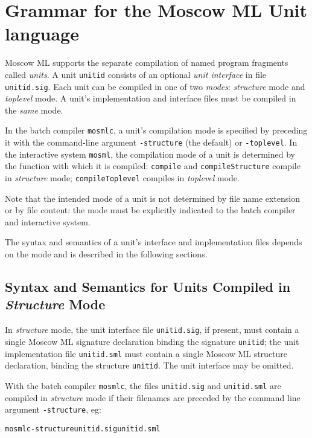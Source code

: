 \documentclass[fleqn]{article}
\begin{document}
\newpage

\section{Grammar for the Moscow ML Unit language}


Moscow ML supports the separate compilation of named program fragments
called \emph{units}.  A unit {\tt unitid} consists of an optional
\emph{unit interface} in file {\tt unitid.sig}.  Each unit can be
compiled in one of two \emph{modes}: \emph{structure} mode and
\emph{toplevel} mode.  A unit's implementation and interface files
must be compiled in the \emph{same} mode.

In the batch compiler {\tt mosmlc}, a unit's compilation mode is
specified by preceding it with the command-line argument {\tt -structure} 
(the default) or {\tt -toplevel}.  In the interactive
system {\tt mosml}, the compilation mode of a unit is determined by
the function with which it is compiled: {\tt compile} and 
{\tt compileStructure} compile in \emph{structure} mode; 
{\tt compileToplevel} compiles in \emph{toplevel} mode.

Note that the intended mode of a unit is not determined by file name
extension or by file content: the mode must be explicitly indicated
to the batch compiler and interactive system.

The syntax and semantics of a unit's interface and implementation
files depends on the mode and is described in the following sections.


\subsection{Syntax and Semantics for Units Compiled in \emph{Structure} Mode}

In \emph{structure} mode, the unit interface file {\tt unitid.sig}, if present, must contain 
a single Moscow ML signature declaration binding the signature {\tt unitid};
the unit implementation file {\tt unitid.sml} must contain a single Moscow ML structure declaration,
binding the structure {\tt unitid}.
The unit interface may be omitted.

With the batch compiler {\tt mosmlc}, the files {\tt unitid.sig} and {\tt unitid.sml} are compiled in \emph{structure} mode if their filenames are preceded by the command line argument {\tt -structure}, eg:

\begin{alltt}
mosmlc -structure unitid.sig unitid.sml 
\end{alltt}
\end{document}
